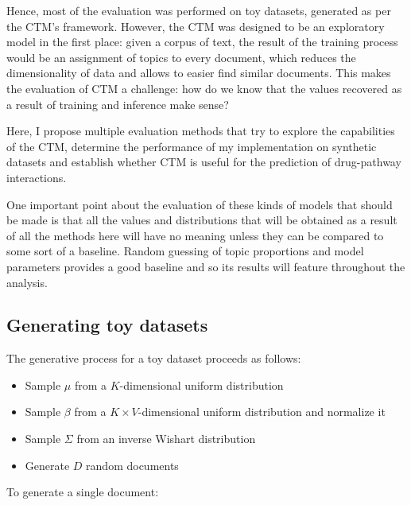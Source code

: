 \documentclass[12pt,a4paper,twoside,openright]{report}
\begin{document}
Hence, most of the evaluation was performed on toy datasets, generated as per the CTM's framework. However, the CTM was designed to be an exploratory model in the first place: given a corpus of text, the result of the training process would be an assignment of topics to every document, which reduces the dimensionality of data and allows to easier find similar documents. This makes the evaluation of CTM a challenge: how do we know that the values recovered as a result of training and inference make sense?


Here, I propose multiple evaluation methods that try to explore the capabilities of the CTM, determine the performance of my implementation on synthetic datasets and establish whether CTM is useful for the prediction of drug-pathway interactions.

One important point about the evaluation of these kinds of models that should be made is that all the values and distributions that will be obtained as a result of all the methods here will have no meaning unless they can be compared to some sort of a baseline. Random guessing of topic proportions and model parameters provides a good baseline and so its results will feature throughout the analysis.

\subsection{Generating toy datasets}

The generative process for a toy dataset proceeds as follows:

\begin{itemize}[noitemsep]
\item Sample $\mu$ from a $K$-dimensional uniform distribution
\item Sample $\beta$ from a $K \times V$-dimensional uniform distribution and normalize it
\item Sample $\Sigma$ from an inverse Wishart distribution
\item Generate $D$ random documents
\end{itemize}

To generate a single document:
\end{document}
